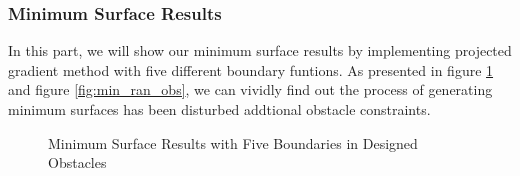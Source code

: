\subsubsection{Minimum Surface Results}
In this part, we will show our minimum surface results by implementing projected gradient method with five different boundary funtions. As presented in figure \ref{fig:min_des_obs} and figure \ref{fig:min_ran_obs}, we can vividly find out the process of generating minimum surfaces has been disturbed addtional obstacle constraints.
\begin{figure}[!htbp]
    \centering
    \caption{Minimum Surface Results with Five Boundaries in Designed Obstacles}
    \label{fig:min_des_obs}  
\end{figure}
